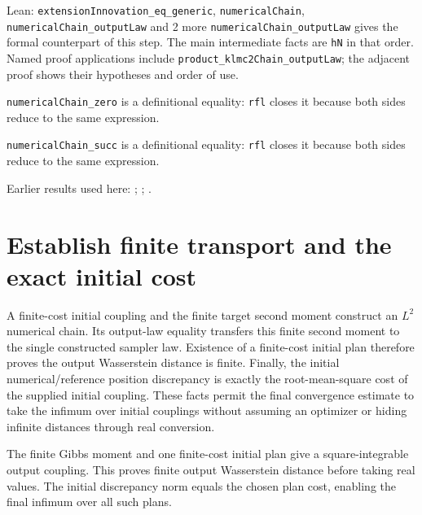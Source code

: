 \documentclass[11pt,a4paper]{article}
\begin{document}
\begin{leanbox}{Lean: \texttt{extensionInnovation\_\allowbreak{}eq\_\allowbreak{}generic}, \texttt{numericalChain}, \texttt{numericalChain\_\allowbreak{}outputLaw} and 2 more}
\texttt{numerical\allowbreak{}Chain\_\allowbreak{}output\allowbreak{}Law} gives the formal counterpart of this step. The main intermediate facts are \texttt{h\allowbreak{}N} in that order. Named proof applications include \texttt{product\_\allowbreak{}klmc2\allowbreak{}Chain\_\allowbreak{}output\allowbreak{}Law}; the adjacent proof shows their hypotheses and order of use.




\texttt{numerical\allowbreak{}Chain\_\allowbreak{}zero} is a definitional equality: \texttt{rfl} closes it because both sides reduce to the same expression.




\texttt{numerical\allowbreak{}Chain\_\allowbreak{}succ} is a definitional equality: \texttt{rfl} closes it because both sides reduce to the same expression.
\end{leanbox}


Earlier results used here: \cite[Section~3.13.2]{LangevinLean2026ULASC}; \cite[Section~3.17.1]{LangevinLean2026ULASC}; \cite[Section~3.17.2]{LangevinLean2026ULASC}.

\section{\texorpdfstring{Establish finite transport and the exact initial cost}{Establish finite transport and the exact initial cost}}


A finite-cost initial coupling and the finite target second moment construct an \(L^{2}\) numerical chain. Its output-law equality transfers this finite second moment to the single constructed sampler law. Existence of a finite-cost initial plan therefore proves the output Wasserstein distance is finite. Finally, the initial numerical/\allowbreak{}reference position discrepancy is exactly the root-mean-square cost of the supplied initial coupling. These facts permit the final convergence estimate to take the infimum over initial couplings without assuming an optimizer or hiding infinite distances through real conversion.



The finite Gibbs moment and one finite-cost initial plan give a square-integrable output coupling. This proves finite output Wasserstein distance before taking real values. The initial discrepancy norm equals the chosen plan cost, enabling the final infimum over all such plans.
\end{document}
